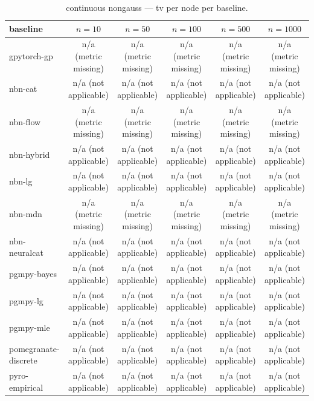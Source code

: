 \begin{table}[h]
\centering
\caption{continuous nongauss — tv per node per baseline.}
\label{tab:continuous_nongauss_tv_per_node}
\begin{tabular}{lccccc}
\toprule
baseline & $n=10$ & $n=50$ & $n=100$ & $n=500$ & $n=1000$ \\
\midrule
gpytorch-gp & n/a (metric missing) & n/a (metric missing) & n/a (metric missing) & n/a (metric missing) & n/a (metric missing) \\
nbn-cat & n/a (not applicable) & n/a (not applicable) & n/a (not applicable) & n/a (not applicable) & n/a (not applicable) \\
nbn-flow & n/a (metric missing) & n/a (metric missing) & n/a (metric missing) & n/a (metric missing) & n/a (metric missing) \\
nbn-hybrid & n/a (not applicable) & n/a (not applicable) & n/a (not applicable) & n/a (not applicable) & n/a (not applicable) \\
nbn-lg & n/a (not applicable) & n/a (not applicable) & n/a (not applicable) & n/a (not applicable) & n/a (not applicable) \\
nbn-mdn & n/a (metric missing) & n/a (metric missing) & n/a (metric missing) & n/a (metric missing) & n/a (metric missing) \\
nbn-neuralcat & n/a (not applicable) & n/a (not applicable) & n/a (not applicable) & n/a (not applicable) & n/a (not applicable) \\
pgmpy-bayes & n/a (not applicable) & n/a (not applicable) & n/a (not applicable) & n/a (not applicable) & n/a (not applicable) \\
pgmpy-lg & n/a (not applicable) & n/a (not applicable) & n/a (not applicable) & n/a (not applicable) & n/a (not applicable) \\
pgmpy-mle & n/a (not applicable) & n/a (not applicable) & n/a (not applicable) & n/a (not applicable) & n/a (not applicable) \\
pomegranate-discrete & n/a (not applicable) & n/a (not applicable) & n/a (not applicable) & n/a (not applicable) & n/a (not applicable) \\
pyro-empirical & n/a (not applicable) & n/a (not applicable) & n/a (not applicable) & n/a (not applicable) & n/a (not applicable) \\
\bottomrule
\end{tabular}
\end{table}

